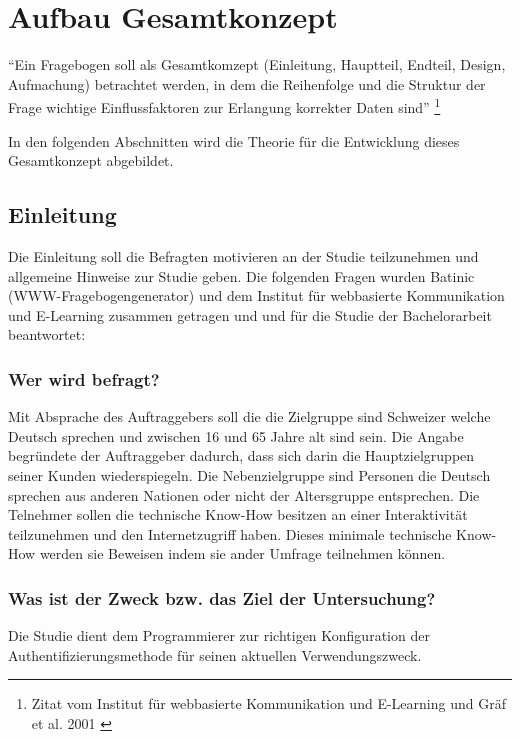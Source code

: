 \section{Aufbau Gesamtkonzept}\label{aufbau-gesamtkonzept}

``Ein Fragebogen soll als Gesamtkomzept (Einleitung, Hauptteil, Endteil,
Design, Aufmachung) betrachtet werden, in dem die Reihenfolge und die
Struktur der Frage wichtige Einflussfaktoren zur Erlangung korrekter
Daten sind'' \footnote{Zitat vom Institut für webbasierte Kommunikation
  und E-Learning und Gräf et al. 2001 \autocite{fragebogen}}

In den folgenden Abschnitten wird die Theorie für die Entwicklung dieses
Gesamtkonzept abgebildet.

\subsection{Einleitung}\label{einleitung}

Die Einleitung soll die Befragten motivieren an der Studie teilzunehmen
und allgemeine Hinweise zur Studie geben. Die folgenden Fragen wurden
Batinic (WWW-Fragebogengenerator) und dem Institut für webbasierte
Kommunikation und E-Learning zusammen getragen und und für die Studie
der Bachelorarbeit beantwortet:

\subsubsection{Wer wird befragt?}\label{wer-wird-befragt}

Mit Absprache des Auftraggebers soll die die Zielgruppe sind Schweizer
welche Deutsch sprechen und zwischen 16 und 65 Jahre alt sind sein. Die
Angabe begründete der Auftraggeber dadurch, dass sich darin die
Hauptzielgruppen seiner Kunden wiederspiegeln. Die Nebenzielgruppe sind
Personen die Deutsch sprechen aus anderen Nationen oder nicht der
Altersgruppe entsprechen. Die Telnehmer sollen die technische Know-How
besitzen an einer Interaktivität teilzunehmen und den Internetzugriff
haben. Dieses minimale technische Know-How werden sie Beweisen indem sie
ander Umfrage teilnehmen können.

\subsubsection{Was ist der Zweck bzw. das Ziel der
Untersuchung?}\label{was-ist-der-zweck-bzw.-das-ziel-der-untersuchung}

Die Studie dient dem Programmierer zur richtigen Konfiguration der
Authentifizierungsmethode für seinen aktuellen Verwendungszweck.

